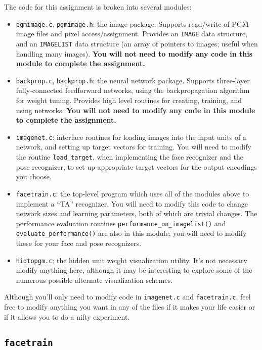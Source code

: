 The code for this assignment is broken into several modules:

\begin{itemize}
\item {\tt pgmimage.c}, {\tt pgmimage.h}: the image package.  Supports
read/write of PGM image files and pixel access/assignment.  Provides
an {\tt IMAGE} data structure, and an {\tt IMAGELIST} data structure
(an array of pointers to images; useful when handling many images). 
{\bf You will not need to modify any code in this module to complete
the assignment.}

\item {\tt backprop.c}, {\tt backprop.h}: the neural network package.
Supports three-layer fully-connected feedforward networks, using the
backpropagation algorithm for weight tuning.  Provides high level
routines for creating, training, and using networks.  {\bf You will not
need to modify any code in this module to complete the assignment.}

\item {\tt imagenet.c}: interface routines for loading images into
the input units of a network, and setting up target vectors for training.
You will need to modify the routine {\tt load\_target}, when
implementing the face recognizer and the pose recognizer, to set
up appropriate target vectors for the output encodings you choose.

\item {\tt facetrain.c}: the top-level program which uses all of the
modules above to implement a ``TA'' recognizer.  You will need to
modify this code to change network sizes and learning parameters,
both of which are trivial changes.  The performance evaluation routines
{\tt performance\_on\_imagelist()} and {\tt evaluate\_performance()} are
also in this module; you will need to modify these for your face
and pose recognizers.

\item {\tt hidtopgm.c}: the hidden unit weight visualization utility.
It's not necessary modify anything here, although it may be interesting
to explore some of the numerous possible alternate visualization schemes.
\end{itemize}

Although you'll only need to modify code in {\tt imagenet.c} and
{\tt facetrain.c}, feel free to modify anything you want in any of
the files if it makes your life easier or if it allows you to do
a nifty experiment.

\subsection {\tt facetrain}


